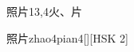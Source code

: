 \begin{entry}{照片}{13,4}{⽕、⽚}
  \begin{phonetics}{照片}{zhao4pian4}[][HSK 2]
  \end{phonetics}
\end{entry}
